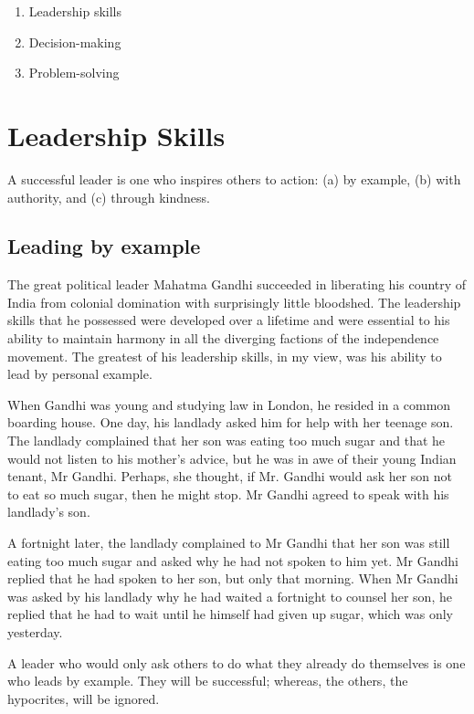 ﻿\documentclass[11pt, openany]{book}
\begin{document}
\begin{enumerate}
\item Leadership skills
\item Decision-making
\item Problem-solving
\end{enumerate}

\chapter{Leadership Skills}

A successful leader is one who inspires others to action: (a) by example, (b) with authority, and (c) through kindness.

\section{Leading by example}

The great political leader Mahatma Gandhi succeeded in liberating his country of India from colonial domination with surprisingly little bloodshed. The leadership skills that he possessed were developed over a lifetime and were essential to his ability to maintain harmony in all the diverging factions of the independence movement. The greatest of his leadership skills, in my view, was his ability to lead by personal example.

When Gandhi was young and studying law in London, he resided in a common boarding house. One day, his landlady asked him for help with her teenage son. The landlady complained that her son was eating too much sugar and that he would not listen to his mother’s advice, but he was in awe of their young Indian tenant, Mr Gandhi. Perhaps, she thought, if Mr. Gandhi would ask her son not to eat so much sugar, then he might stop. Mr Gandhi agreed to speak with his landlady’s son.

A fortnight later, the landlady complained to Mr Gandhi that her son was still eating too much sugar and asked why he had not spoken to him yet. Mr Gandhi replied that he had spoken to her son, but only that morning. When Mr Gandhi was asked by his landlady why he had waited a fortnight to counsel her son, he replied that he had to wait until he himself had given up sugar, which was only yesterday.

A leader who would only ask others to do what they already do themselves is one who leads by example. They will be successful; whereas, the others, the hypocrites, will be ignored.
\end{document}
